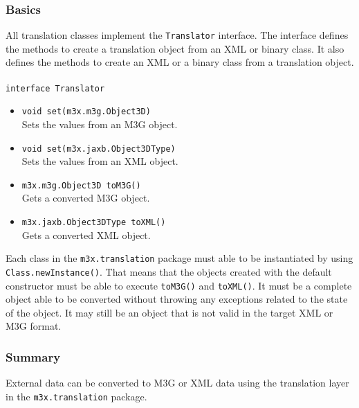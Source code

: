 \subsubsection{Basics}
All translation classes implement the \texttt{Translator} interface. The interface defines the methods to create a translation object from an XML or binary class. It also defines the methods to create an XML or a binary class from a translation object.
\\\\
\texttt{interface Translator}
\begin{itemize}
\item \texttt{void set(m3x.m3g.Object3D)}\\Sets the values from an M3G object.
\item \texttt{void set(m3x.jaxb.Object3DType)}\\Sets the values from an XML object.
\item \texttt{m3x.m3g.Object3D toM3G()}\\Gets a converted M3G object.
\item \texttt{m3x.jaxb.Object3DType toXML()}\\Gets a converted XML object.
\end{itemize}


Each class in the \texttt{m3x.translation} package must able to be instantiated by using \texttt{Class.newInstance()}. That means that the objects created with the default constructor must be able to execute \texttt{toM3G()} and \texttt{toXML()}. It must be a complete object able to be converted without throwing any exceptions related to the state of the object. It may still be an object that is not valid in the target XML or M3G format.


\subsubsection{Summary}
External data can be converted to M3G or XML data using the translation layer in the \texttt{m3x.translation} package.


